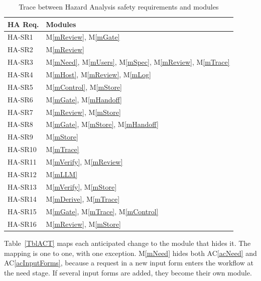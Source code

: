\documentclass[12pt, titlepage]{article}
\newcommand{\acref}[1]{AC\ref{#1}}
\newcommand{\mref}[1]{M\ref{#1}}
\begin{document}
\begin{longtable}{p{} p{}}
\caption{Trace between Hazard Analysis safety requirements and modules} \label{TblHA}\\
\toprule
\textbf{HA Req.} & \textbf{Modules}\\
\midrule
\endhead
HA-SR1 & \mref{mReview}, \mref{mGate}\\
HA-SR2 & \mref{mReview}\\
HA-SR3 & \mref{mNeed}, \mref{mUsers}, \mref{mSpec}, \mref{mReview}, \mref{mTrace}\\
HA-SR4 & \mref{mHost}, \mref{mReview}, \mref{mLog}\\
HA-SR5 & \mref{mControl}, \mref{mStore}\\
HA-SR6 & \mref{mGate}, \mref{mHandoff}\\
HA-SR7 & \mref{mReview}, \mref{mStore}\\
HA-SR8 & \mref{mGate}, \mref{mStore}, \mref{mHandoff}\\
HA-SR9 & \mref{mStore}\\
HA-SR10 & \mref{mTrace}\\
HA-SR11 & \mref{mVerify}, \mref{mReview}\\
HA-SR12 & \mref{mLLM}\\
HA-SR13 & \mref{mVerify}, \mref{mStore}\\
HA-SR14 & \mref{mDerive}, \mref{mTrace}\\
HA-SR15 & \mref{mGate}, \mref{mTrace}, \mref{mControl}\\
HA-SR16 & \mref{mReview}, \mref{mStore}\\
\bottomrule
\end{longtable}

Table~\ref{TblACT} maps each anticipated change to the module that hides it.
The mapping is one to one, with one exception. \mref{mNeed} hides both
\acref{acNeed} and \acref{acInputForms}, because a request in a new input form
enters the workflow at the need stage. If several input forms are added, they
become their own module.
\end{document}
